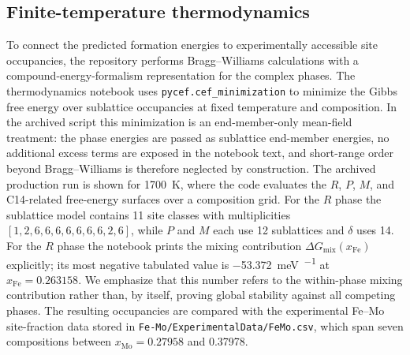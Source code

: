 \subsection{Finite-temperature thermodynamics}

To connect the predicted formation energies to experimentally accessible site occupancies, the repository performs Bragg--Williams calculations with a compound-energy-formalism representation for the complex phases. The thermodynamics notebook uses \texttt{pycef.cef\_minimization} to minimize the Gibbs free energy over sublattice occupancies at fixed temperature and composition. In the archived script this minimization is an end-member-only mean-field treatment: the phase energies are passed as sublattice end-member energies, no additional excess terms are exposed in the notebook text, and short-range order beyond Bragg--Williams is therefore neglected by construction. The archived production run is shown for \SI{1700}{\kelvin}, where the code evaluates the $R$, $P$, $M$, and C14-related free-energy surfaces over a composition grid. For the $R$ phase the sublattice model contains 11 site classes with multiplicities $[1,2,6,6,6,6,6,6,6,2,6]$, while $P$ and $M$ each use 12 sublattices and $\delta$ uses 14. For the $R$ phase the notebook prints the mixing contribution $\Delta G_{\mathrm{mix}}(x_{\mathrm{Fe}})$ explicitly; its most negative tabulated value is \SI{-53.372}{\milli\electronvolt\per\atom} at $x_{\mathrm{Fe}}=0.263158$. We emphasize that this number refers to the within-phase mixing contribution rather than, by itself, proving global stability against all competing phases. The resulting occupancies are compared with the experimental Fe--Mo site-fraction data stored in \texttt{Fe-Mo/ExperimentalData/FeMo.csv}, which span seven compositions between $x_{\mathrm{Mo}}=0.27958$ and 0.37978. %

